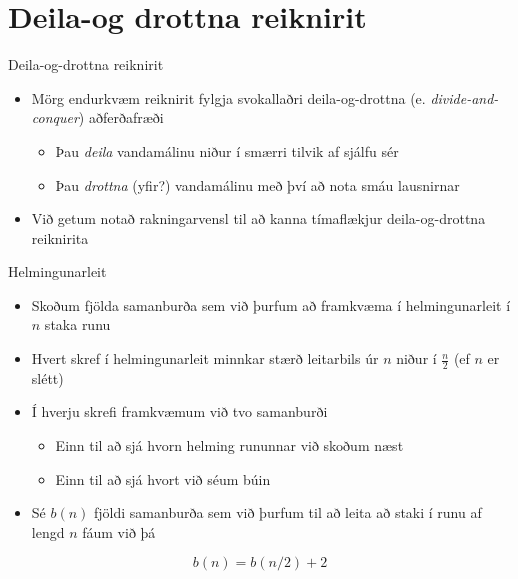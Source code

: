 \documentclass[handout]{beamer}
\begin{document}
% 
% 



\section{Deila-og drottna reiknirit}

\begin{frame}{Deila-og-drottna reiknirit}
\begin{itemize}
 \item Mörg endurkvæm reiknirit fylgja svokallaðri deila-og-drottna (e. \emph{divide-and-conquer}) aðferðafræði
 \begin{itemize}
  \item Þau \emph{deila} vandamálinu niður í smærri tilvik af sjálfu sér
  \item Þau \emph{drottna} (yfir?) vandamálinu með því að nota smáu lausnirnar
 \end{itemize}
 \item Við getum notað rakningarvensl til að kanna tímaflækjur deila-og-drottna reiknirita
\end{itemize}
\end{frame}

\begin{frame}{Helmingunarleit}
\begin{itemize}
 \item Skoðum fjölda samanburða sem við þurfum að framkvæma í helmingunarleit í $n$ staka runu
 \item Hvert skref í helmingunarleit minnkar stærð leitarbils úr $n$ niður í $\frac{n}{2}$ (ef $n$ er slétt)
 \item Í hverju skrefi framkvæmum við tvo samanburði
 \begin{itemize}
  \item Einn til að sjá hvorn helming rununnar við skoðum næst
  \item Einn til að sjá hvort við séum búin
 \end{itemize}
 \item Sé $b(n)$ fjöldi samanburða sem við þurfum til að leita að staki í runu af lengd $n$ fáum við þá
\end{itemize}
\[
 b(n) = b(n/2) + 2
\]
\end{frame}
\end{document}
